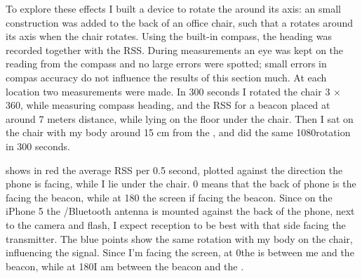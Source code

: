 To explore these effects I built a device to rotate the \device around its axis: an small construction was added to the back of an office chair, such that a \device rotates around its axis when the chair rotates.
Using the built-in compass, the heading was recorded together with the RSS.
During measurements an eye was kept on the reading from the compass and no large errors were spotted; small errors in compas accuracy do not influence the results of this section much.
At each location two measurements were made.
In 300 seconds I rotated the chair 3 $\times$ 360\textdegree, while measuring compass heading, and the RSS for a beacon placed at around 7 meters distance, while lying on the floor under the chair.
Then I sat on the chair with my body around 15 cm from the \device, and did the same 1080\textdegree rotation in 300 seconds.


 shows in red the average RSS per 0.5 second, plotted against the direction the phone is facing, while I lie under the chair.
0\textdegree{} means that the back of phone is the facing the beacon, while at 180\textdegree{} the screen if facing the beacon.
Since on the iPhone 5 the \wifi/Bluetooth antenna is mounted against the back of the phone, next to the camera and flash, I expect reception to be best with that side facing the transmitter.
The blue points show the same rotation with my body on the chair, influencing the signal.
Since I'm facing the screen, at 0\textdegree the \device is between me and the beacon, while at 180\textdegree I am between the beacon and the \device.

